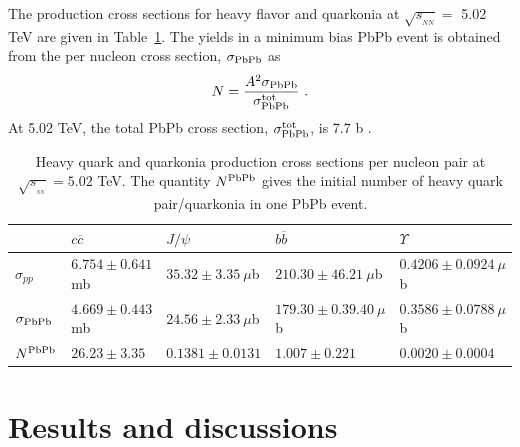 \documentclass[12pt,a4paper,final]{iopart} %
\newcommand{\Jpsi}{J/\psi}
\newcommand{\sNN}{\sqrt{s_{_{NN}}}}
\begin{document}
The production cross sections for heavy flavor and quarkonia at $\sNN =$ 5.02 
TeV are given in Table~\ref{Tab:NLOcross}.  The yields in a minimum bias 
PbPb event is obtained from the per nucleon cross
section, $\sigma_{\rm PbPb}$ as 
\begin{eqnarray}
  N = \frac{A^2 \sigma_{\rm PbPb}}{\sigma_{\rm PbPb}^{\rm tot}} \, \, .
\end{eqnarray}
At 5.02 TeV, the total PbPb cross section, $\sigma_{\rm PbPb}^{\rm tot}$, 
is 7.7 b \cite{Chatrchyan:2011sx}.










\begin{table}
\caption[]{ Heavy quark and quarkonia production  cross sections per nucleon pair at
  $\sqrt{s_{_{_{NN}}}}= 5.02$ TeV. The quantity $N^{\rm PbPb}$ gives the initial number of
  heavy quark pair/quarkonia in one PbPb event.}
\label{Tab:NLOcross}
\begin{tabular}{l|l|l|l|l} 
\hline 
\hline
             &$ c \overline c$            &$\Jpsi$                      & $ b \overline b$                    & $\Upsilon$   \\              
\hline
$\sigma_{pp}$  &$6.754\pm0.641$ mb     & $35.32\pm3.35~\mu$b     & $210.30\pm46.21~\mu$b            & $0.4206\pm0.0924~\mu$b  \\


$\sigma_{\rm PbPb}$ &$4.669\pm0.443$ mb    &$24.56\pm2.33~\mu$b    & $179.30\pm0.39.40~\mu$b             &$0.3586\pm0.0788~\mu$b  \\


$N^{\rm PbPb}$     &$26.23\pm3.35$       & $0.1381\pm0.0131$         & $1.007\pm0.221$                  & $0.0020\pm0.0004$       \\

\hline
\hline
\end{tabular}
\end{table}






\section{Results and discussions}
\end{document}
